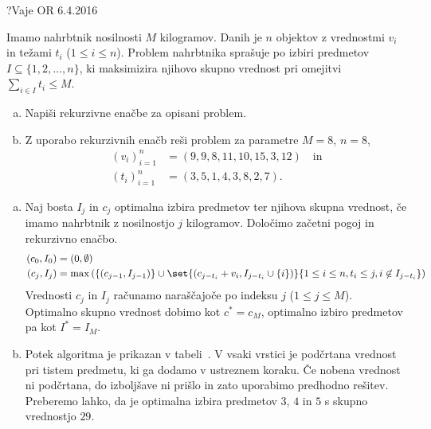 \begin{naloga}{?}{Vaje OR 6.4.2016}
\begin{vprasanje}
Imamo nahrbtnik nosilnosti $M$ kilogramov.
Danih je $n$ objektov z vrednostmi $v_i$ in težami $t_i$ ($1 \le i \le n$).
Problem nahrbtnika sprašuje po izbiri predmetov
$I \subseteq \{1, 2, \dots, n\}$,
ki maksimizira njihovo skupno vrednost pri omejitvi $\sum_{i \in I} t_i \le M$.
\begin{enumerate}[(a)]
\item Napiši rekurzivne enačbe za opisani problem.
\item Z uporabo rekurzivnih enačb reši problem za parametre $M = 8$, $n = 8$,
\begin{align*}
(v_i)_{i=1}^n &= (9, 9, 8, 11, 10, 15, 3, 12) \quad \text{in} \\
(t_i)_{i=1}^n &= (3, 5, 1, 4, 3, 8, 2, 7).
\end{align*}
\end{enumerate}
\end{vprasanje}

\begin{odgovor}
\begin{enumerate}[(a)]
\item Naj bosta $I_j$ in $c_j$
optimalna izbira predmetov ter njihova skupna vrednost,
če imamo nahrbtnik z nosilnostjo $j$ kilogramov.
Določimo začetni pogoj in rekurzivno enačbo.
\begin{align*}
(c_0, I_0) &= (0, \emptyset) \\
(c_j, I_j) &= \max\left(\{(c_{j-1}, I_{j-1})\} \cup
    \set{(c_{j-t_i} + v_i, I_{j-t_i} \cup \{i\})}%
        {1 \le i \le n, t_i \le j, i \not\in I_{j-t_i}}\right)
\end{align*}
Vrednosti $c_j$ in $I_j$ računamo naraščajoče po indeksu $j$
($1 \le j \le M$).
Optimalno skupno vrednost dobimo kot $c^* = c_M$,
optimalno izbiro predmetov pa kot $I^* = I_M$.

\item Potek algoritma je prikazan v tabeli~\tab.
V vsaki vrstici je podčrtana vrednost pri tistem predmetu,
ki ga dodamo v ustreznem koraku.
Če nobena vred\-nost ni podčrtana,
do izboljšave ni prišlo in zato uporabimo predhodno rešitev.
Preberemo lahko,
da je optimalna izbira predmetov $3$, $4$ in $5$ s skupno vrednostjo $29$.
\end{enumerate}


\end{odgovor}
\end{naloga}
